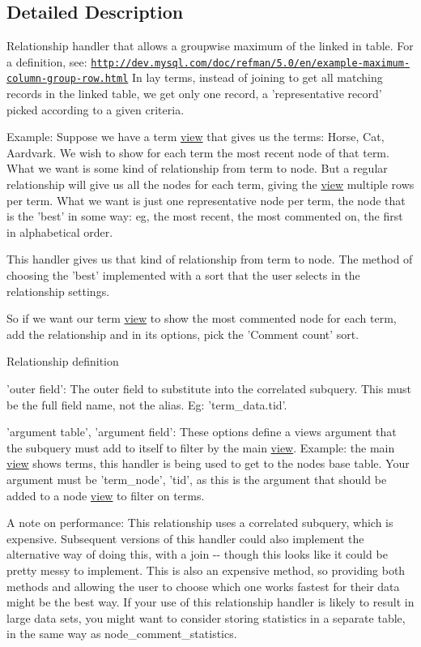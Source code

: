 \subsection{Detailed Description}
Relationship handler that allows a groupwise maximum of the linked in table. For a definition, see: \href{http://dev.mysql.com/doc/refman/5.0/en/example-maximum-column-group-row.html}{\tt http://dev.mysql.com/doc/refman/5.0/en/example-\/maximum-\/column-\/group-\/row.html} In lay terms, instead of joining to get all matching records in the linked table, we get only one record, a 'representative record' picked according to a given criteria.

Example: Suppose we have a term \hyperlink{classview}{view} that gives us the terms: Horse, Cat, Aardvark. We wish to show for each term the most recent node of that term. What we want is some kind of relationship from term to node. But a regular relationship will give us all the nodes for each term, giving the \hyperlink{classview}{view} multiple rows per term. What we want is just one representative node per term, the node that is the 'best' in some way: eg, the most recent, the most commented on, the first in alphabetical order.

This handler gives us that kind of relationship from term to node. The method of choosing the 'best' implemented with a sort that the user selects in the relationship settings.

So if we want our term \hyperlink{classview}{view} to show the most commented node for each term, add the relationship and in its options, pick the 'Comment count' sort.

Relationship definition
\begin{DoxyItemize}
\item 'outer field': The outer field to substitute into the correlated subquery. This must be the full field name, not the alias. Eg: 'term\_\-data.tid'.
\item 'argument table', 'argument field': These options define a views argument that the subquery must add to itself to filter by the main \hyperlink{classview}{view}. Example: the main \hyperlink{classview}{view} shows terms, this handler is being used to get to the nodes base table. Your argument must be 'term\_\-node', 'tid', as this is the argument that should be added to a node \hyperlink{classview}{view} to filter on terms.
\end{DoxyItemize}

A note on performance: This relationship uses a correlated subquery, which is expensive. Subsequent versions of this handler could also implement the alternative way of doing this, with a join -\/-\/ though this looks like it could be pretty messy to implement. This is also an expensive method, so providing both methods and allowing the user to choose which one works fastest for their data might be the best way. If your use of this relationship handler is likely to result in large data sets, you might want to consider storing statistics in a separate table, in the same way as node\_\-comment\_\-statistics. 

